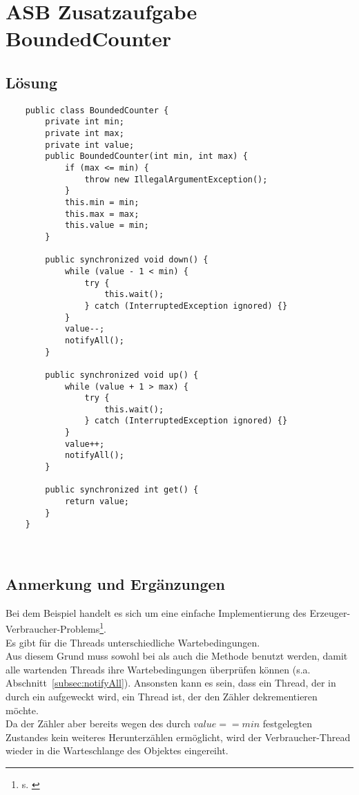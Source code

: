 \chapter{ASB Zusatzaufgabe BoundedCounter}\label{ch:boundedcounter}


\section{Lösung}

\begin{verbatim}
    public class BoundedCounter {
        private int min;
        private int max;
        private int value;
        public BoundedCounter(int min, int max) {
            if (max <= min) {
                throw new IllegalArgumentException();
            }
            this.min = min;
            this.max = max;
            this.value = min;
        }

        public synchronized void down() {
            while (value - 1 < min) {
                try {
                    this.wait();
                } catch (InterruptedException ignored) {}
            }
            value--;
            notifyAll();
        }

        public synchronized void up() {
            while (value + 1 > max) {
                try {
                    this.wait();
                } catch (InterruptedException ignored) {}
            }
            value++;
            notifyAll();
        }

        public synchronized int get() {
            return value;
        }
    }
\end{verbatim}\\


\section{Anmerkung und Ergänzungen}

Bei dem Beispiel handelt es sich um eine einfache Implementierung des Erzeuger-Verbraucher-Problems\footnote{
s. \cite[Abschnitt 2.6.1]{Oec22}
}.\\
\noindent
Es gibt für die Threads unterschiedliche Wartebedingungen.\\
Aus diesem Grund muss sowohl bei  als auch  die Methode  benutzt werden, damit alle wartenden Threads ihre Wartebedingungen überprüfen können (s.a. Abschnitt~\ref{subsec:notifyAll}).
Ansonsten kann es sein, dass ein Thread, der in  durch ein   aufgeweckt wird, ein Thread ist, der den Zähler dekrementieren möchte.\\
Da der Zähler aber bereits wegen des durch $value == min$ festgelegten Zustandes kein weiteres Herunterzählen ermöglicht, wird der Verbraucher-Thread wieder in die Warteschlange des Objektes eingereiht.\\

